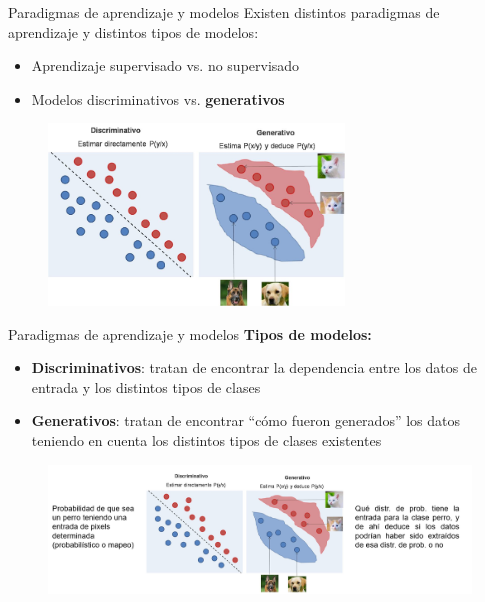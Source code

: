 \begin{frame}{Paradigmas de aprendizaje y modelos}
Existen distintos paradigmas de aprendizaje y distintos tipos de modelos:
\begin{itemize}
    \item Aprendizaje supervisado vs. no supervisado
    \item Modelos discriminativos vs. \textbf{generativos}
\end{itemize}

\begin{figure}
    \centering
    \includegraphics[width=0.7\textwidth]{Slides/figures/02_Metodos_Generativos/2.1. disc vs gen.png}
\end{figure}
\end{frame}


\begin{frame}{Paradigmas de aprendizaje y modelos}
\textbf{Tipos de modelos:}

\begin{itemize}
    \item \textbf{Discriminativos}: tratan de encontrar la dependencia entre los datos de entrada y los distintos tipos de clases
    \item \textbf{Generativos}: tratan de encontrar “cómo fueron generados” los datos teniendo en cuenta los distintos tipos de clases existentes
\end{itemize}

\begin{figure}
    \centering
    \includegraphics[width=\textwidth]{Slides/figures/02_Metodos_Generativos/2.1. disc gen.png}
\end{figure}
\end{frame}

